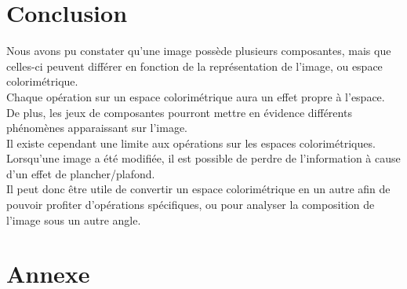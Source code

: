 \documentclass[a4paper]{article}
\begin{document}
\clearpage


\section{Conclusion}
Nous avons pu constater qu'une image possède plusieurs composantes, mais que celles-ci peuvent différer en fonction de la représentation de l'image, ou espace colorimétrique.\\

Chaque opération sur un espace colorimétrique aura un effet propre à l'espace. De plus, les jeux de composantes pourront mettre en évidence différents phénomènes apparaissant sur l'image.\\
Il existe cependant une limite aux opérations sur les espaces colorimétriques. Lorsqu'une image a été modifiée, il est possible de perdre de l'information à cause d'un effet de plancher/plafond.\\

Il peut donc être utile de convertir un espace colorimétrique en un autre afin de pouvoir profiter d'opérations spécifiques, ou pour analyser la composition de l'image sous un autre angle.

\clearpage

\section{Annexe}
\end{document}
